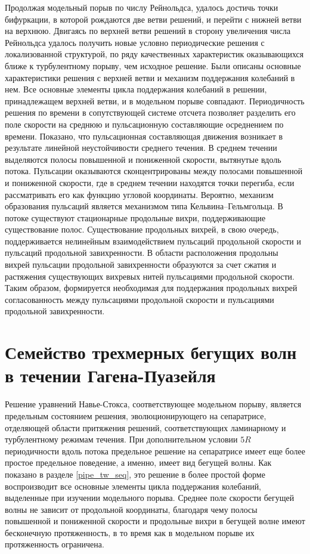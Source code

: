 Продолжая модельный порыв по числу Рейнольдса, удалось достичь точки бифуркации, в которой рождаются две ветви решений, и перейти с нижней ветви на верхнюю. Двигаясь по верхней ветви решений в сторону увеличения числа Рейнольдса удалось получить новые условно периодические решения с локализованной структурой, по ряду качественных характеристик оказывающихся ближе к турбулентному порыву, чем исходное решение. Были описаны основные характеристики решения с верхней ветви и механизм поддержания колебаний в нем. Все основные элементы цикла поддержания колебаний в решении, принадлежащем верхней ветви, и в модельном порыве совпадают. Периодичность решения по времени в сопутствующей системе отсчета позволяет разделить его поле скорости на среднюю и пульсационную составляющие осреднением по времени. Показано, что пульсационная составляющая движения возникает в результате линейной неустойчивости среднего течения. В среднем течении выделяются полосы повышенной и пониженной скорости, вытянутые вдоль потока. Пульсации оказываются сконцентрированы между полосами повышенной и пониженной скорости, где в среднем течении находятся точки перегиба, если рассматривать его как функцию угловой координаты. Вероятно, механизм образования пульсаций является механизмом типа Кельвина--Гельмгольца. В потоке существуют стационарные продольные вихри, поддерживающие существование полос. Существование продольных вихрей, в свою очередь, поддерживается нелинейным взаимодействием пульсаций продольной скорости и пульсаций продольной завихренности. В области расположения продольны вихрей пульсации продольной завихренности образуются за счет сжатия и растяжения существующих вихревых нитей пульсациями продольной скорости. Таким образом, формируется необходимая для поддержания продольных вихрей согласованность между пульсациями продольной скорости и пульсациями продольной завихренности. 

\section{Семейство трехмерных бегущих волн в течении Гагена-Пуазейля}

Решение уравнений Навье-Стокса, соответствующее модельном порыву, является предельным состоянием решения, эволюционирующего на сепаратрисе, отделяющей области притяжения решений, соответствующих ламинарному и турбулентному режимам течения. При дополнительном условии $5R$ периодичности вдоль потока предельное решение на сепаратрисе имеет еще более простое предельное поведение, а именно, имеет вид бегущей волны. Как показано в разделе \ref{pipe_tw_seq}, это решение в более простой форме воспроизводит все основные элементы цикла поддержания колебаний, выделенные при изучении модельного порыва. Среднее поле скорости бегущей волны не зависит от продольной координаты, благодаря чему полосы повышенной и пониженной скорости и продольные вихри в бегущей волне имеют бесконечную протяженность, в то время как в модельном порыве их протяженность ограничена. 


